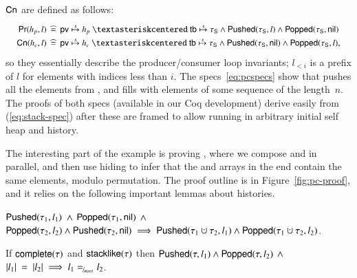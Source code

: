 $\mathsf{Cn}$ are defined as follows:
%
%
\[
{\small
\def\arraystretch{1.3}
\begin{array}{r@{\ }c@{\ }l}
\Prod(h_p, l)&\eqdef&
   \hpriv \spts h_p ~\sep~ \htb \spts \histS \aand 
   \Pushed{\histS}{l}  \aand  \Popped{\histS}{\nil}
\\
\Cons(h_c, l)&\eqdef&
   \hpriv \spts h_c ~\sep~ \htb \spts \histS \aand
   \Pushed{\histS}{\nil}  \aand  \Popped{\histS}{l},
\end{array}
}
\]
%
so they essentially describe the producer/consumer loop invariants;
%
$l_{<i}$ is a prefix of $l$ for elements with indices less than $i$.
%
The specs~\eqref{eq:pcspecs} show that  pushes all the
elements from , and  fills  with
elements of some sequence of the length~$n$. The proofs of both specs
(available in our Coq development) derive easily from
(\ref{eq:stack-spec}) after these are framed to allow running in
arbitrary initial self heap and history.
%



The interesting part of the example is proving , where
we compose  and  in parallel, and then use
hiding to infer that the  and  arrays in the end
contain the same elements, modulo permutation. The proof outline is in
Figure~\ref{fig:pc-proof}, and it relies on the following important
lemmas about histories.
%
%
%
\begin{lemma}
\label{lm:pushpop1}
%
$\mathsf{Pushed}(\tau_1, l_1)$ $\wedge$ $\mathsf{Popped}(\tau_1, \mathsf{nil})$ $\wedge$
$\Popped{\hist_2}{l_2} \aand \Pushed{\hist_2}{\nil} \implies
\Pushed{\hist_1 \hunion \hist_2}{l_1} \aand \Popped{\hist_1 \hunion
  \hist_2}{l_2} $.
\end{lemma}
%
\begin{lemma}
\label{lm:pushpop2}
If $\mathsf{complete}(\tau)$ and $\mathsf{stacklike}(\tau)$ then $\mathsf{Pushed}(\tau, l_1)
\wedge \mathsf{Popped}(\tau, l_2)$ $\wedge$\\ $|l_1|~=~|l_2| \implies l_1 =_{\!/_{\!\text{\emph{mset}}}}
l_2$.
\end{lemma} 
%

